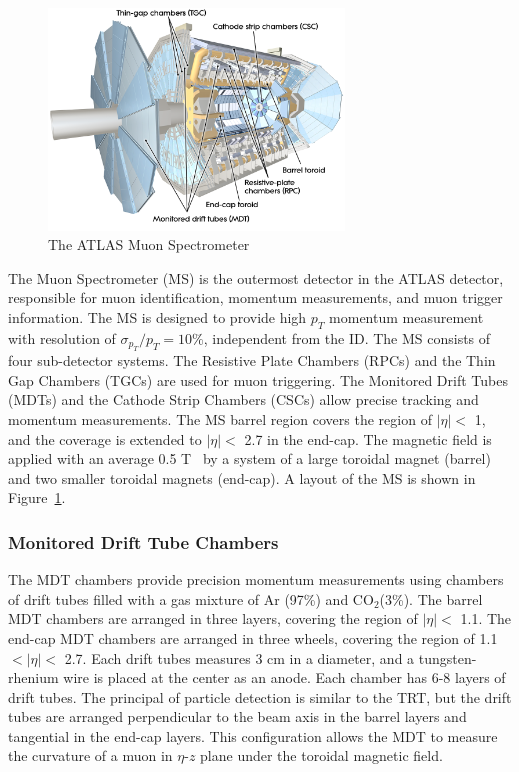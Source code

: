\begin{figure}[!htb]
    \includegraphics[width=0.7\textwidth]{figures/ms.png}
    \centering
    \caption{The ATLAS Muon Spectrometer}
    \label{fig:ms}
\end{figure}
The Muon Spectrometer (MS) is the outermost detector in the ATLAS detector, responsible for muon identification, momentum measurements, and muon trigger information. The MS is designed to provide high $p_{T}$ momentum measurement with resolution of $\sigma_{p_{T}} / p_{T} = 10\%$, independent from the ID. The MS consists of four sub-detector systems. The Resistive Plate Chambers (RPCs) and the Thin Gap Chambers (TGCs) are used for muon triggering. The Monitored Drift Tubes (MDTs) and the Cathode Strip Chambers (CSCs) allow precise tracking and momentum measurements. The MS barrel region covers the region of $|\eta|<$ 1, and the coverage is extended to $|\eta|<$ 2.7 in the end-cap. The magnetic field is applied with an average 0.5 T~\cite{ARNAUD2008265} by a system of a large toroidal magnet (barrel) and two smaller toroidal magnets (end-cap). A layout of the MS is shown in Figure~\ref{fig:ms}.

\subsubsection{Monitored Drift Tube Chambers}
\label{sec:atlas:mdt}

The MDT chambers provide precision momentum measurements using chambers of drift tubes filled with a gas mixture of Ar (97\%) and $\mathrm{CO}_{2}$(3\%). The barrel MDT chambers are arranged in three layers, covering the region of $|\eta|<$ 1.1. The end-cap MDT chambers are arranged in three wheels, covering the region of 1.1 $<|\eta|<$ 2.7. Each drift tubes measures 3 \si{\centi\meter} in a diameter, and a tungsten-rhenium wire is placed at the center as an anode. Each chamber has 6-8 layers of drift tubes. The principal of particle detection is similar to the TRT, but the drift tubes are arranged perpendicular to the beam axis in the barrel layers and tangential in the end-cap layers. This configuration allows the MDT to measure the curvature of a muon in $\eta$-$z$ plane under the toroidal magnetic field.

